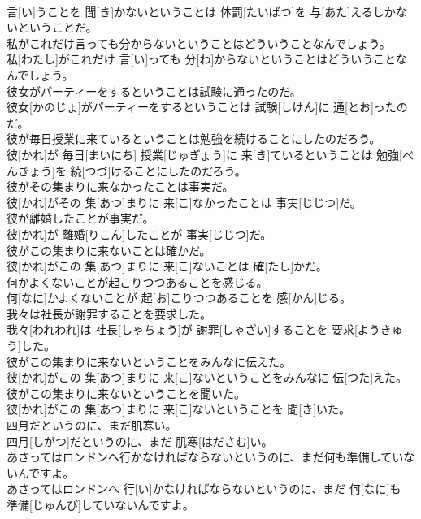 \documentclass[8pt]{extreport}
\begin{document}
\begin{CJK}{UTF8}{min}
\\	言[い]うことを 聞[き]かないということは 体罰[たいばつ]を 与[あた]えるしかないということだ。
\\	私がこれだけ言っても分からないということはどういうことなんでしょう。	
\\	私[わたし]がこれだけ 言[い]っても 分[わ]からないということはどういうことなんでしょう。
\\	彼女がパーティーをするということは試験に通ったのだ。	
\\	彼女[かのじょ]がパーティーをするということは 試験[しけん]に 通[とお]ったのだ。
\\	彼が毎日授業に来ているということは勉強を続けることにしたのだろう。	
\\	彼[かれ]が 毎日[まいにち] 授業[じゅぎょう]に 来[き]ているということは 勉強[べんきょう]を 続[つづ]けることにしたのだろう。
\\	彼がその集まりに来なかったことは事実だ。	
\\	彼[かれ]がその 集[あつ]まりに 来[こ]なかったことは 事実[じじつ]だ。
\\	彼が離婚したことが事実だ。	
\\	彼[かれ]が 離婚[りこん]したことが 事実[じじつ]だ。
\\	彼がこの集まりに来ないことは確かだ。	
\\	彼[かれ]がこの 集[あつ]まりに 来[こ]ないことは 確[たし]かだ。
\\	何かよくないことが起こりつつあることを感じる。	
\\	何[なに]かよくないことが 起[お]こりつつあることを 感[かん]じる。
\\	我々は社長が謝罪することを要求した。	
\\	我々[われわれ]は 社長[しゃちょう]が 謝罪[しゃざい]することを 要求[ようきゅう]した。
\\	彼がこの集まりに来ないということをみんなに伝えた。	
\\	彼[かれ]がこの 集[あつ]まりに 来[こ]ないということをみんなに 伝[つた]えた。
\\	彼がこの集まりに来ないということを聞いた。	
\\	彼[かれ]がこの 集[あつ]まりに 来[こ]ないということを 聞[き]いた。
\\	四月だというのに、まだ肌寒い。	
\\	四月[しがつ]だというのに、まだ 肌寒[はださむ]い。
\\	あさってはロンドンへ行かなければならないというのに、まだ何も準備していないんですよ。	
\\	あさってはロンドンへ 行[い]かなければならないというのに、まだ 何[なに]も 準備[じゅんび]していないんですよ。

\end{CJK}
\end{document}
